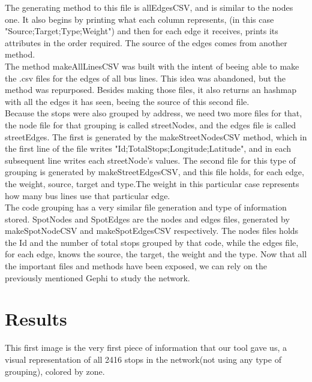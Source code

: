 \documentclass[12pt]{article}
\begin{document}
	The generating method to this file is allEdgesCSV, and is similar to the nodes one.
	It also begins by printing what each column represents, (in this case "Source;Target;Type;Weight") and then for each edge it receives, prints its attributes in the order required. The source of the edges comes from another method.\\
	The method makeAllLinesCSV was built with the intent of beeing able to make the .csv files for the edges of all bus lines. This idea was abandoned, but the method was repurposed. Besides making those files, it also returns an hashmap with all the edges it has seen, beeing the source of this second file.\\
	Because the stops were also grouped by address, we need two more files for that, the node file for that grouping is called streetNodes, and the edges file is called streetEdges. The first is generated by the makeStreetNodesCSV method, which in the first line of the file writes "Id;TotalStops;Longitude;Latitude", and in each subsequent line writes each streetNode's values. The second file for this type of grouping  is generated by makeStreetEdgesCSV, and this file holds, for each edge, the weight, source, target and type.The weight in this particular case represents how many bus lines use that particular edge.\\
	The code grouping has a very similar file generation and type of information stored. SpotNodes and SpotEdges are the nodes and edges files, generated by makeSpotNodeCSV and makeSpotEdgesCSV respectively. The nodes files holds the Id and the number of total stops grouped by that code, while the edges file, for each edge, knows the source, the target, the weight and the type.
	Now that all the important files and methods have been exposed, we can rely on the previously mentioned Gephi to study the network.\\
	
\section{Results}
	This first image is the very first piece of information that our tool gave us, a visual representation of all 2416 stops in the network(not using any type of grouping), colored by zone.\\
\end{document}
